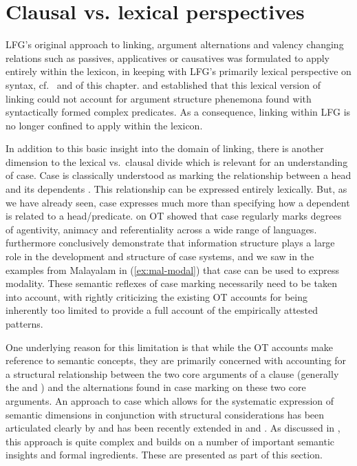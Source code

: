 \documentclass[output=paper,hidelinks]{langscibook}
\begin{document}
 


\section{Clausal vs. lexical perspectives}
\label{sec:sem}

LFG's original approach to linking,  argument alternations and valency
changing relations such as passives, applicatives or causatives was formulated
to apply entirely within the lexicon, in keeping with LFG's primarily lexical
perspective on syntax, cf.~ and  of this chapter. \citet{MohananT1994,Butt1995} and \citet{alsina1996the-role}  established
that this lexical version of linking could not account for argument structure
phenemona found with syntactically formed complex predicates.  As a consequence, 
linking within LFG is no longer confined to apply  within the
lexicon.

In addition to this basic insight into the domain of linking, there is 
another dimension to the lexical vs.~clausal divide which is relevant for an
understanding of case.  Case is classically understood as marking the
relationship between a head and its dependents \citep{blake-case}. This
relationship can be
expressed entirely lexically. But, as we have already seen, case 
expresses much more than specifying how a dependent is related to a
head/predicate.  on OT  showed that case
regularly marks degrees of agentivity, animacy and referentiality across a wide
range of languages.  \citet{DN} furthermore conclusively demonstrate that
information structure plays a large role in the development and structure of
case systems, and we saw in the examples from Malayalam in (\ref{ex:mal-modal})
that case can be used to express modality.  These semantic reflexes of case
marking necessarily need to be taken into account, with \citet{DN} rightly
criticizing the existing OT accounts for being inherently too limited to
provide a full account of the empirically attested patterns.

One underlying reason for this limitation is that while the OT accounts make
reference to semantic concepts, they are primarily concerned with accounting for
a structural relationship between the two core arguments of a clause (generally
the \SUBJ and \OBJ) and the alternations found in case marking on these two core
arguments. An approach to case which allows for the systematic expression of
semantic dimensions in conjunction with structural considerations has been
articulated clearly by \citet{buttking03-case, buttking05} and has been
recently extended in \citet{schaetzle18} and \citet{beck-butt2021}.  
As discussed in , this approach is quite complex and builds
on a number of important semantic insights and formal ingredients.  These are
presented  as part of this section. 
\end{document}
